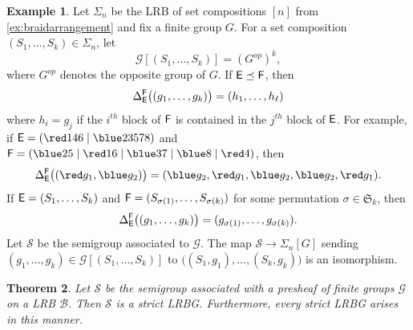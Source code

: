 \documentclass[11pt, oneside, reqno]{amsart}
\newtheorem{theorem}{Theorem}[section]
\theoremstyle{definition}
\newtheorem{example}[theorem]{Example}
\numberwithin{equation}{section}
\def \BB{{\mathcal{B}}}
\def \GG{{\mathcal{G}}}
\def \SS{{\mathcal{S}}}
\def \gsetcomposition{{\Sigma_n[G]}}
\def \hsiao {{\gsetcomposition}}
\begin{document}
\begin{example}\label{ex:presheaf-hsiao}
    Let $\Sigma_n$ be the LRB of set compositions $[n]$ from \cref{ex:braidarrangement}
    and fix a finite group $G$.
    For a set composition $(S_1, \ldots, S_k) \in \Sigma_n$, let
    \[
        \GG[ (S_1,\dots,S_k) ] = (G^{op})^k,
    \]
    where $G^{op}$ denotes the opposite group of $G$.
    If ${\sf E} \preceq {\sf F}$, then
    \[
        \Delta_{\sf E}^{\sf F} \big( (g_1,\dots,g_k) \big) = (h_1,\dots,h_\ell)
    \]
    where $h_i = g_j$ if the $i^{th}$ block of ${\sf F}$ is contained in the $j^{th}$ block of ${\sf E}$.
    For example, if ${\sf E} = ( {\red 146} \mid {\blue 23578} )$ and ${\sf F} = ({\blue 25} \mid {\red 16} \mid {\blue 37} \mid {\blue 8} \mid {\red4})$, then
    \[
        \Delta_{\sf E}^{\sf F} \big( ({\red g_1},{\blue g_2}) \big) = ({\blue g_2},{\red g_1},{\blue g_2},{\blue g_2}, {\red g_1}).
    \]
    If ${\sf E} = (S_1,\dots,S_k)$ and ${\sf F} = (S_{\sigma(1)},\dots,S_{\sigma(k)})$ for some permutation $\sigma \in \mathfrak{S}_k$, then
    \[
        \Delta_{\sf E}^{\sf F} \big( (g_1,\dots,g_k) \big) = (g_{\sigma(1)},\dots,g_{\sigma(k)}).
    \]
    Let $\SS$ be the semigroup associated to $\GG$. The map $\SS \to \hsiao$ sending $(g_1 , \dots , g_k) \in \GG[(S_1 , \dots , S_k)]$ to $\big( (S_1,g_1) , \dots , (S_k,g_k) \big)$ is an isomorphism.

\end{example}

\begin{theorem}\label{thm:presheaf<->sLRBG}
    Let $\SS$ be the semigroup associated with a presheaf of finite groups
    $\GG$ on a LRB $\BB$. Then $\SS$ is a strict LRBG. Furthermore, every
    strict LRBG arises in this manner.
\end{theorem}
\end{document}
